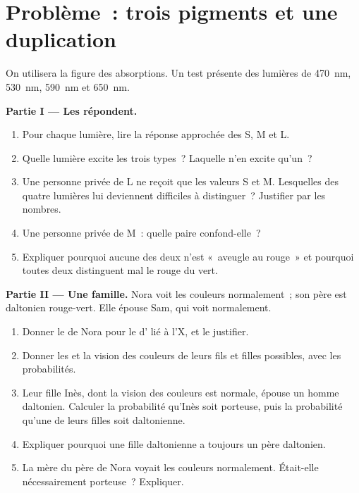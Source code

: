 \section{Problème~: trois pigments et une duplication}

\begin{problem}
\label{pb:g11:the-eye:1}
On utilisera la figure des absorptions. Un test présente des lumières
de \qty{470}{nm}, \qty{530}{nm}, \qty{590}{nm} et \qty{650}{nm}.

\medskip
\noindent\textbf{Partie I --- Les  répondent.}
\begin{enumerate}
  \item Pour chaque lumière, lire la réponse approchée des  S, M
        et L.
  \item Quelle lumière excite les trois types~? Laquelle n'en excite
        qu'un~?
  \item Une personne privée de  L ne reçoit que les valeurs S et
        M. Lesquelles des quatre lumières lui deviennent difficiles à
        distinguer~? Justifier par les nombres.
  \item Une personne privée de  M~: quelle paire confond-elle~?
  \item Expliquer pourquoi aucune des deux n'est «~aveugle au rouge~»
        et pourquoi toutes deux distinguent mal le rouge du vert.
\end{enumerate}

\medskip
\noindent\textbf{Partie II --- Une famille.}
Nora voit les couleurs normalement~; son père est daltonien
rouge-vert. Elle épouse Sam, qui voit normalement.
\begin{enumerate}[resume]
  \item Donner le  de Nora pour le  d' lié à l'X, et
        le justifier.
  \item Donner les  et la vision des couleurs de leurs fils et
        filles possibles, avec les probabilités.
  \item Leur fille Inès, dont la vision des couleurs est normale,
        épouse un homme daltonien. Calculer la probabilité qu'Inès soit
        porteuse, puis la probabilité qu'une de leurs filles soit
        daltonienne.
  \item Expliquer pourquoi une fille daltonienne a toujours un père
        daltonien.
  \item La mère du père de Nora voyait les couleurs normalement.
        Était-elle nécessairement porteuse~? Expliquer.
\end{enumerate}


\end{problem}
